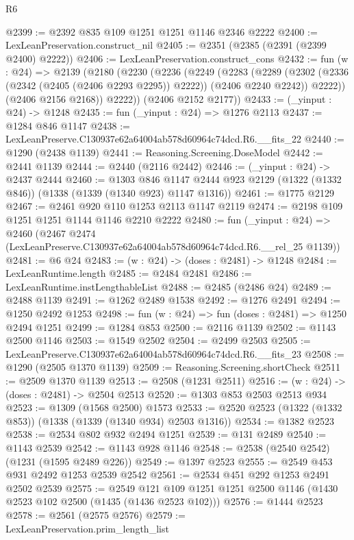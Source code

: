 \begin{lexlean}{R6}
\begin{coremodule}
@2399 := @2392 @835 @109 @1251 @1251 @1146 @2346 @2222
@2400 := LexLeanPreservation.construct_nil
@2405 := @2351 (@2385 (@2391 (@2399 @2400) @2222))
@2406 := LexLeanPreservation.construct_cons
@2432 := fun (w : @24) =>
  @2139
    (@2180
      (@2230
        (@2236
          (@2249
            (@2283
              (@2289
                (@2302 (@2336 (@2342 (@2405 (@2406 @2293 @2295)) @2222)) (@2406 @2240 @2242))
                @2222))
            (@2406 @2156 @2168))
          @2222))
      (@2406 @2152 @2177))
@2433 := (_yinput : @24) -> @1248
@2435 := fun (_yinput : @24) => @1276 @2113
@2437 := @1284 @846 @1147
@2438 := LexLeanPreserve.C130937e62a64004ab578d60964c74dcd.R6.__fits_22
@2440 := @1290 (@2438 @1139)
@2441 := Reasoning.Screening.DoseModel
@2442 := @2441 @1139
@2444 := @2440 (@2116 @2442)
@2446 := (_yinput : @24) -> @2437 @2444
@2460 := @1303
    @846
    @1147
    @2444
    @923
    @2129
    (@1322 (@1332 @846))
    (@1338 (@1339 (@1340 @923) @1147 @1316))
@2461 := @1775 @2129
@2467 := @2461 @920 @110 @1253 @2113 @1147 @2119
@2474 := @2198 @109 @1251 @1251 @1144 @1146 @2210 @2222
@2480 := fun (_yinput : @24) =>
  @2460 (@2467 @2474 (LexLeanPreserve.C130937e62a64004ab578d60964c74dcd.R6.__rel_25 @1139))
@2481 := @6 @24
@2483 := (w : @24) -> (doses : @2481) -> @1248
@2484 := LexLeanRuntime.length
@2485 := @2484 @2481
@2486 := LexLeanRuntime.instLengthableList
@2488 := @2485 (@2486 @24)
@2489 := @2488 @1139
@2491 := @1262 @2489 @1538
@2492 := @1276 @2491
@2494 := @1250 @2492 @1253
@2498 := fun (w : @24) => fun (doses : @2481) => @1250 @2494 @1251
@2499 := @1284 @853
@2500 := @2116 @1139
@2502 := @1143 @2500 @1146
@2503 := @1549 @2502
@2504 := @2499 @2503
@2505 := LexLeanPreserve.C130937e62a64004ab578d60964c74dcd.R6.__fits_23
@2508 := @1290 (@2505 @1370 @1139)
@2509 := Reasoning.Screening.shortCheck
@2511 := @2509 @1370 @1139
@2513 := @2508 (@1231 @2511)
@2516 := (w : @24) -> (doses : @2481) -> @2504 @2513
@2520 := @1303 @853 @2503 @2513 @934
@2523 := @1309 (@1568 @2500) @1573
@2533 := @2520 @2523 (@1322 (@1332 @853)) (@1338 (@1339 (@1340 @934) @2503 @1316))
@2534 := @1382 @2523
@2538 := @2534 @802 @932 @2494 @1251
@2539 := @131 @2489
@2540 := @1143 @2539
@2542 := @1143 @928 @1146
@2548 := @2538 (@2540 @2542) (@1231 (@1595 @2489 @226))
@2549 := @1397 @2523
@2555 := @2549 @453 @931 @2492 @1253 @2539 @2542
@2561 := @2534 @451 @292 @1253 @2491 @2502 @2539
@2575 := @2549 @121 @109 @1251 @1251 @2500 @1146 (@1430 @2523 @102 @2500 (@1435 (@1436 @2523 @102)))
@2576 := @1444 @2523
@2578 := @2561 (@2575 @2576)
@2579 := LexLeanPreservation.prim_length_list

\end{coremodule}
\end{lexlean}
